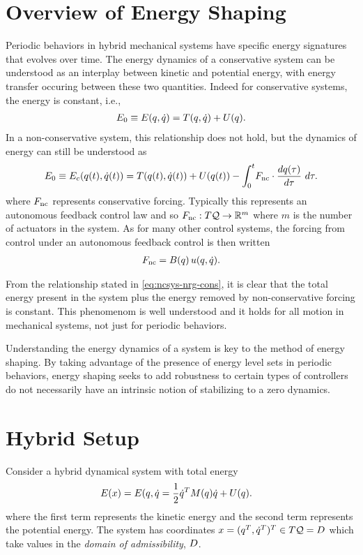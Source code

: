 \section*{Overview of Energy Shaping}
Periodic behaviors in hybrid mechanical systems have specific energy signatures that evolves over time.
%
The energy dynamics of a conservative system can be understood as an interplay between kinetic and potential energy, with energy transfer occuring between these two quantities.
%
Indeed for conservative systems, the energy is constant, i.e.,
\begin{align}
  E_{0} \equiv E(q, \dot{q}) = T(q, \dot{q}) + U(q).
\end{align}
%
In a non-conservative system, this relationship does not hold, but the dynamics of energy can still be understood as
\begin{align}
  \label{eq:ncsys-nrg-cons}
  E_{0} \equiv E_{c}(q(t), \dot{q}(t)) = T(q(t), \dot{q}(t)) + U(q(t)) - \int_{0}^{t} \! F_{\mathrm{nc}} \cdot \frac{dq(\tau)}{d\tau} \ d\tau.
\end{align}
where $F_{\mathrm{nc}}$ represents conservative forcing. Typically this represents an autonomous feedback control law and so $F_{\mathrm{nc}} : T\mathcal{Q} \to \mathbb{R}^m$ where $m$ is the number of actuators in the system.
%
As for many other control systems, the forcing from control under an autonomous feedback control is then written
\begin{align}
  F_{\mathrm{nc}} = B(q) \, u(q, \dot{q}).
\end{align}

From the relationship stated in \eqref{eq:ncsys-nrg-cons}, it is clear that the total energy present in the system plus the energy removed by non-conservative forcing is constant.
%
This phenomenom is well understood and it holds for all motion in mechanical systems, not just for periodic behaviors.

Understanding the energy dynamics of a system is key to the method of energy shaping.
%
By taking advantage of the presence of energy level sets in periodic behaviors, energy shaping seeks to add robustness to certain types of controllers do not necessarily have an intrinsic notion of stabilizing to a zero dynamics.
%


\section*{Hybrid Setup}
Consider a hybrid dynamical system with total energy
\begin{align*}
  E(x) &= E(q, \dot{q} = \frac{1}{2} \dot{q}^{T} M(q) \dot{q} + U(q).
\end{align*}
where the first term represents the kinetic energy and the second term represents the potential energy.
%
The system has coordinates $x = (q^T, \dot{q}^T)^T \in T\mathcal{Q} = D$ which take values in the {\em domain of admissibility}, $D$.

